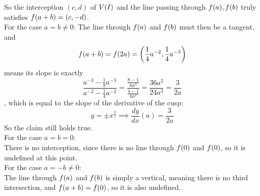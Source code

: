 \documentclass[a4paper]{scrartcl}
\begin{document}
So the interception $(c,d)$ of $V{\left( I \right)}$ and the line passing through $f{\left( a \right)},f{\left( b \right)}$ truly satisfies $f{\left( a+b \right)}=(c,-d)$.\\
For the case $a=b\neq0$:
The line through $f{\left( a \right)}$ and $f{\left( b \right)}$ must then be a tangent, and
\[f{\left( a+b \right)}=f{\left( 2a \right)}=\left( \frac{1}{4}a^{-2},\frac{1}{4}a^{-3} \right)\]
means its slope is exactly
\[\frac{a^{-3}-\frac{1}{8}a^{-3}}{a^{-2}-\frac{1}{4}a^{-2}}=\frac{\frac{8-1}{8a^3}}{\frac{4-1}{4a^2}}=\frac{36a^2}{24a^3}=\frac{3}{2a}\]
, which is equal to the slope of the derivative of the cusp:
\[y=\pm x^{\frac{3}{2}}\implies \frac{dy}{dx}(a)=\frac{3}{2a}\]
So the claim still holds true.\\
For the case $a=b=0$:\\
There is no interception, since there is no line through $f{\left( 0 \right)}$ and $f{\left( 0 \right)}$, so it is undefined at this point.\\
For the case $a=-b\neq0$:\\
The line through $f{\left( a \right)}$ and $f{\left( b \right)}$ is simply a vertical, meaning there is no third intersection, and $f{\left( a+b \right)}=f{\left( 0 \right)}$, so it is also undefined.
\end{document}
